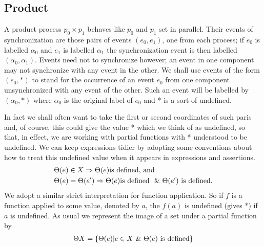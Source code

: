 \documentclass{article}
\begin{document}
\subsection{Product}

A product process $p_0 \times p_1$ behaves like $p_0$ and $p_1$ set in parallel.
Their events of synchronization are those pairs of events $(e_0,e_1)$, one from each process;
if $e_0$ is labelled $\alpha_0$ and $e_1$ is labelled $\alpha_1$ the synchronization event is
then labelled $(\alpha_0,\alpha_1)$.
Events need not to synchronize however; an event in one component may not synchronize with
any event in the other.
We shall use events of the form $(e_0,*)$ to stand for the occurrence of an event $e_0$
from one component unsynchronized with any event of the other.
Such an event will be labelled by $(\alpha_0,*)$ where $\alpha_0$ is the original label of $e_0$
and * is a sort of undefined.

In fact we shall often want to take the first or second coordinates of such paris and,
of course, this could give the value * which we think of as undefined,
so that, in effect, we are working with partial functions with * understood to be undefined.
We can keep expressions tidier by adopting some conventions about how to treat this undefined value
when it appears in expressions and assertions.
\begin{align*}
     & \Theta(e) \in X \Rightarrow \Theta(e) \text{is defined, and }                                      \\
     & \Theta(e) = \Theta(e') \Rightarrow \Theta(e) \text{is defined } \ \& \  \Theta(e')\text{ is defined}.
\end{align*}
We adopt a similar strict interpretation for function application.
So if $f$ is a function applied to some value, denoted by $a$, the $f(a)$ is undefined (gives *)
if $a$ is undefined.
As usual we represent the image of a set under a partial function by
\begin{align*}
    \Theta X = \{\Theta(e)|e \in X \ \& \  \Theta(e) \text{ is defined}\}
\end{align*}
\end{document}
